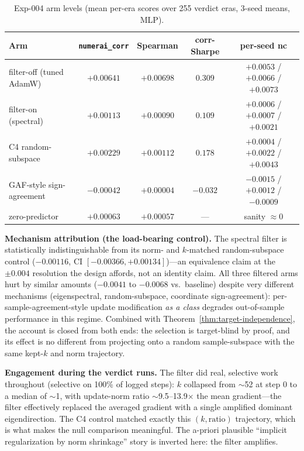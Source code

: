 \begin{table}[t]
\centering
\footnotesize
\begin{tabular}{lcccc}
\toprule
Arm & \texttt{numerai\_corr} & Spearman & corr-Sharpe & per-seed nc \\
\midrule
filter-off (tuned AdamW) & $+0.00641$ & $+0.00698$ & $0.309$ & $+0.0053$ / $+0.0066$ / $+0.0073$ \\
filter-on (spectral) & $+0.00113$ & $+0.00090$ & $0.109$ & $+0.0006$ / $+0.0007$ / $+0.0021$ \\
C4 random-subspace & $+0.00229$ & $+0.00112$ & $0.178$ & $+0.0004$ / $+0.0022$ / $+0.0043$ \\
GAF-style sign-agreement & $-0.00042$ & $+0.00004$ & $-0.032$ & $-0.0015$ / $+0.0012$ / $-0.0009$ \\
zero-predictor & $+0.00063$ & $+0.00057$ & --- & sanity $\approx 0$ \\
\bottomrule
\end{tabular}
\caption{Exp-004 arm levels (mean per-era scores over 255 verdict eras,
  3-seed means, MLP).}
\label{tab:arms}
\end{table}

\textbf{Mechanism attribution (the load-bearing control).} The spectral
filter is statistically indistinguishable from its norm- and $k$-matched
random-subspace control ($-0.00116$, CI $[-0.00366, +0.00134]$)---an
equivalence claim at the $\pm 0.004$ resolution the design affords, not an
identity claim. All three filtered arms hurt by similar amounts
($-0.0041$ to $-0.0068$ vs.\ baseline) despite very different mechanisms
(eigenspectral, random-subspace, coordinate sign-agreement):
per-sample-agreement-style update modification \emph{as a class} degrades
out-of-sample performance in this regime. Combined with
Theorem~\ref{thm:target-independence}, the account is closed from both
ends: the selection is target-blind by proof, and its effect is no
different from projecting onto a random sample-subspace with the same
kept-$k$ and norm trajectory.

\textbf{Engagement during the verdict runs.} The filter did real, selective
work throughout (selective on 100\% of logged steps): $k$ collapsed from
$\sim$52 at step 0 to a median of $\sim$1, with update-norm ratio
$\sim$9.5--13.9$\times$ the mean gradient---the filter effectively replaced
the averaged gradient with a single amplified dominant eigendirection.
The C4 control matched exactly this $(k, \text{ratio})$ trajectory, which
is what makes the null comparison meaningful. The a-priori plausible
``implicit regularization by norm shrinkage'' story is inverted here: the
filter amplifies.

